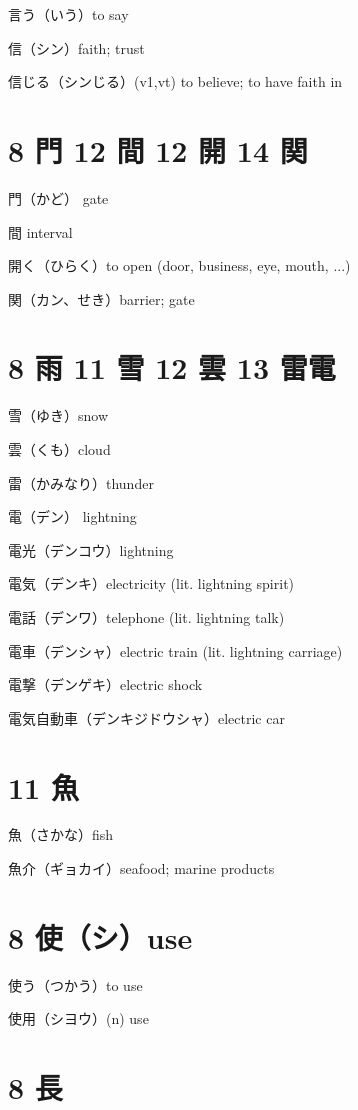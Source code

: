 言う（いう）to say

信（シン）faith; trust

信じる（シンじる）(v1,vt) to believe; to have faith in

\section{8 門 12 間 12 開 14 関}

門（かど） gate

間 interval

開く（ひらく）to open (door, business, eye, mouth, ...)

関（カン、せき）barrier; gate

\section{8 雨 11 雪 12 雲 13 雷電}

雪（ゆき）snow

雲（くも）cloud

雷（かみなり）thunder

電（デン） lightning

電光（デンコウ）lightning

電気（デンキ）electricity (lit. lightning spirit)

電話（デンワ）telephone (lit. lightning talk)

電車（デンシャ）electric train (lit. lightning carriage)

電撃（デンゲキ）electric shock

電気自動車（デンキジドウシャ）electric car

\section{11 魚}

魚（さかな）fish

魚介（ギョカイ）seafood; marine products

\section{8 使（シ）use}

使う（つかう）to use

使用（シヨウ）(n) use

\section{8 長}


